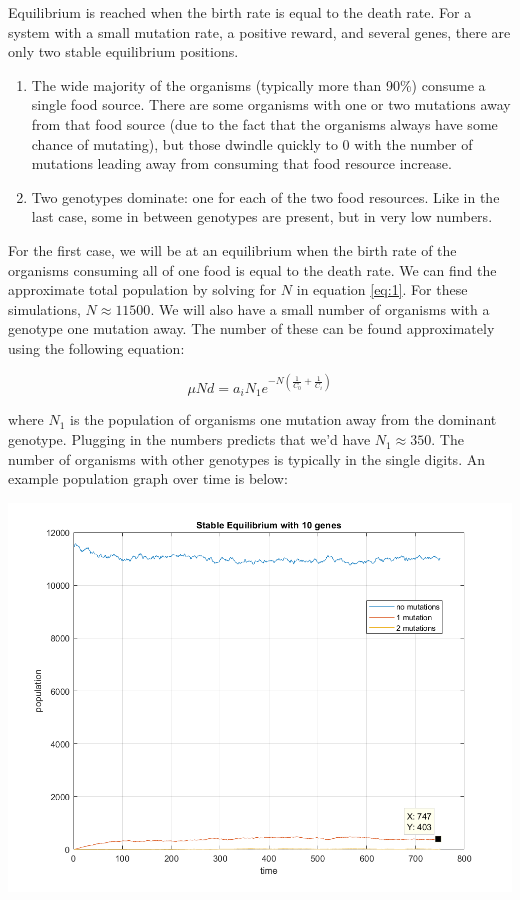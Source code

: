\documentclass[11pt]{article}
\begin{document}
Equilibrium is reached when the birth rate is equal to the death rate. For a system with a small mutation rate, a positive reward, and several genes, there are only two stable equilibrium positions.

	\begin{enumerate}
		
		\item
		The wide majority of the organisms (typically more than 90\%) consume a single food source. There are some organisms with one or two mutations away from that food source (due to the fact that the organisms always have some chance of mutating), but those dwindle quickly to 0 with the number of mutations leading away from consuming that food resource increase.
		
		\item
		Two genotypes dominate: one for each of the two food resources. Like in the last case, some in between genotypes are present, but in very low numbers.
		
	\end{enumerate}
	
	For the first case, we will be at an equilibrium when the birth rate of the organisms consuming all of one food is equal to the death rate.	We can find the approximate total population by solving for $N$ in equation \ref{eq:1}. For these simulations, $N \approx 11500$. We will also have a small number of organisms with a genotype one mutation away. The number of these can be found approximately using the following equation:
	
	\begin{equation*}
		\mu N d = a_iN_1e^{-N(\frac{1}{C_0} + \frac{1}{C_i})}
	\end{equation*}
	
	where $N_1$ is the population of organisms one mutation away from the dominant genotype. Plugging in the numbers predicts that we'd have $N_1 \approx 350$. The number of organisms with other genotypes is typically in the single digits. An example population graph over time is below:
	
	\includegraphics[scale = .8]{stable_equil}
\end{document}
